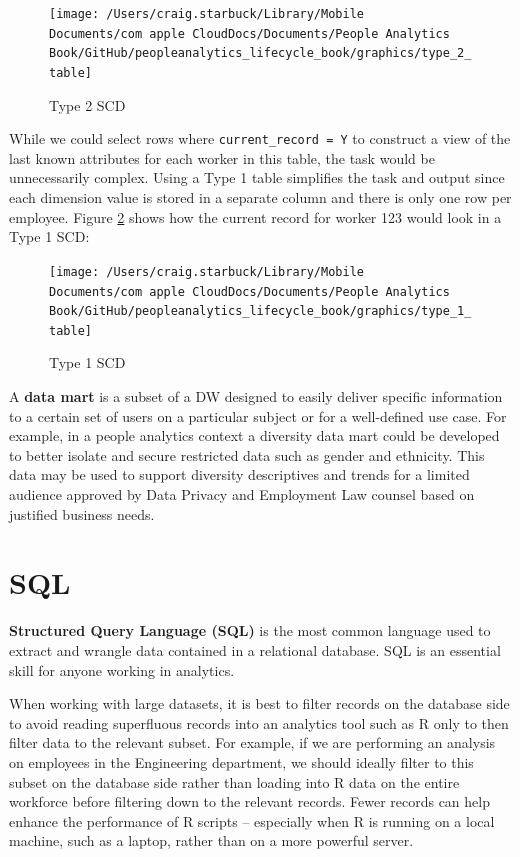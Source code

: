 \documentclass[]{book}
\begin{document}
\begin{figure}

{\centering \texttt{[image: /Users/craig.starbuck/Library/Mobile Documents/com~apple~CloudDocs/Documents/People Analytics Book/GitHub/peopleanalytics\_lifecycle\_book/graphics/type\_2\_table]} 

}

\caption{Type 2 SCD}\label{fig:type-2-tbl}
\end{figure}

While we could select rows where \texttt{current\_record\ =\ \textquotesingle{}Y\textquotesingle{}} to construct a view of the last known attributes for each worker in this table, the task would be unnecessarily complex. Using a Type 1 table simplifies the task and output since each dimension value is stored in a separate column and there is only one row per employee. Figure \ref{fig:type-1-tbl} shows how the current record for worker 123 would look in a Type 1 SCD:

\begin{figure}

{\centering \texttt{[image: /Users/craig.starbuck/Library/Mobile Documents/com~apple~CloudDocs/Documents/People Analytics Book/GitHub/peopleanalytics\_lifecycle\_book/graphics/type\_1\_table]} 

}

\caption{Type 1 SCD}\label{fig:type-1-tbl}
\end{figure}

A \textbf{data mart} is a subset of a DW designed to easily deliver specific information to a certain set of users on a particular subject or for a well-defined use case. For example, in a people analytics context a diversity data mart could be developed to better isolate and secure restricted data such as gender and ethnicity. This data may be used to support diversity descriptives and trends for a limited audience approved by Data Privacy and Employment Law counsel based on justified business needs.

\hypertarget{sql}{%
\section{SQL}\label{sql}}

\textbf{Structured Query Language (SQL)} is the most common language used to extract and wrangle data contained in a relational database. SQL is an essential skill for anyone working in analytics.

When working with large datasets, it is best to filter records on the database side to avoid reading superfluous records into an analytics tool such as R only to then filter data to the relevant subset. For example, if we are performing an analysis on employees in the Engineering department, we should ideally filter to this subset on the database side rather than loading into R data on the entire workforce before filtering down to the relevant records. Fewer records can help enhance the performance of R scripts -- especially when R is running on a local machine, such as a laptop, rather than on a more powerful server.
\end{document}

